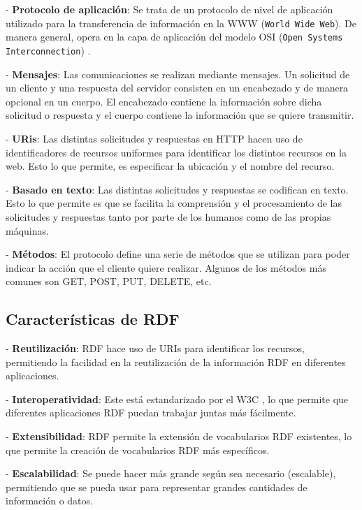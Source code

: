 \documentclass[11pt]{report}
\begin{document}
\indent \indent \indent - \textbf{Protocolo de aplicación}: Se trata de un protocolo de nivel de aplicación utilizado para la transferencia de información en la WWW (\texttt{World Wide Web}). De manera general, opera en la capa de aplicación del modelo OSI (\texttt{Open Systems Interconnection}) \cite{1}. 

\indent \indent \indent - \textbf{Mensajes}: Las comunicaciones se realizan mediante mensajes. Un solicitud de un cliente y una respuesta del servidor consisten en un encabezado y de manera opcional en un cuerpo. El encabezado contiene la información sobre dicha solicitud o respuesta y el cuerpo contiene la información que se quiere transmitir.

\indent \indent \indent - \textbf{URis}: Las distintas solicitudes y respuestas en HTTP hacen uso de identificadores de recursos uniformes para identificar los distintos recursos en la web. Esto lo que permite, es especificar la ubicación y el nombre del recurso.

\indent \indent \indent - \textbf{Basado en texto}: Las distintas solicitudes y respuestas se codifican en texto.  Esto lo que permite es que se facilita la comprensión y el procesamiento de las solicitudes y respuestas tanto por parte de los humanos como de las propias máquinas.

\indent \indent \indent - \textbf{Métodos}: El protocolo define una serie de métodos que se utilizan para poder indicar la acción que el cliente quiere realizar. Algunos de los métodos más comunes son GET, POST, PUT, DELETE, etc.

\subsection{Características de RDF} \label{subsec:Características-RDF}

\indent \indent \indent - \textbf{Reutilización}: RDF hace uso de URIs para identificar los recursos, permitiendo la facilidad en la reutilización de la información RDF en diferentes aplicaciones.

\indent \indent \indent - \textbf{Interoperatividad}: Este está estandarizado por el W3C \cite{5}, lo que permite que diferentes aplicaciones RDF puedan trabajar juntas más fácilmente.

\indent \indent \indent - \textbf{Extensibilidad}: RDF permite la extensión de vocabularios RDF existentes, lo que permite la creación de vocabularios RDF más específicos.

\indent \indent \indent - \textbf{Escalabilidad}: Se puede hacer más grande según sea necesario (escalable),  permitiendo que se pueda usar para representar grandes cantidades de información o datos.
\end{document}
